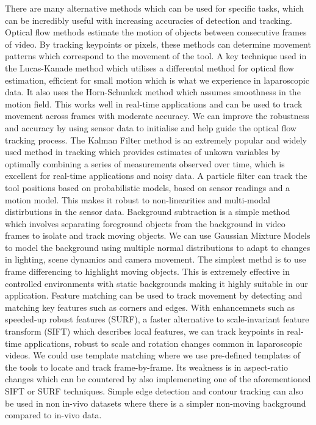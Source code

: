 There are many alternative methods which can be used for specific tasks, which can be incredibly useful with increasing accuracies of detection and tracking. Optical flow methods estimate the motion of objects between consecutive frames of video. By tracking keypoints or pixels, these methods can determine movement patterns which correspond to the movement of the tool. A key technique used in the Lucas-Kanade method which utilises a differental method for optical flow estimation, efficient for small motion which is what we experience in laparoscopic data. It also uses the Horn-Schunkck method which assumes smoothness in the motion field. This works well in real-time applications and can be used to track movement across frames with moderate accuracy. We can improve the robustness and accuracy by using sensor data to initialise and help guide the optical flow tracking process. The Kalman Filter method is an extremely popular and widely used method in tracking which provides estimates of unkown variables by optimally combining a series of measurements observed over time, which is excellent for real-time applications and noisy data. A particle filter can track the tool positions based on probabilistic models, based on sensor readings and a motion model. This makes it robust to non-linearities and multi-modal distirbutions in the sensor data. Background subtraction is a simple method which involves separating foreground objects from the background in video frames to isolate and track moving objects. We can use Gaussian Mixture Models to model the background using multiple normal distributions to adapt to changes in lighting, scene dynamics and camera movement. The simplest methd is to use frame differencing to highlight moving objects. This is extremely effective in controlled environments with static backgrounds making it highly suitable in our application. Feature matching can be used to track movement by detecting and matching key features such as corners and edges. With enhancemnets such as speeded-up robust features (SURF), a faster alternative to scale-invariant feature transform (SIFT) which describes local features, we can track keypoints in real-time applications, robust to scale and rotation changes common in laparoscopic videos. We could use template matching where we use pre-defined templates of the tools to locate and track frame-by-frame. Its weakness is in aspect-ratio changes which can be countered by also implemeneting one of the aforementioned SIFT or SURF techniques. Simple edge detection and contour tracking can also be used in non in-vivo datasets where there is a simpler non-moving background compared to in-vivo data.

